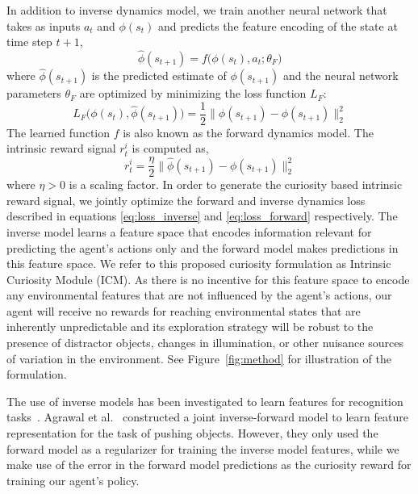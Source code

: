 \documentclass{article}
\begin{document}
In addition to inverse dynamics model, we train another neural network that takes as inputs $a_t$ and $\phi(s_t)$ and predicts the feature encoding of the state at time step $t+1$,
\begin{equation}
   \hat{\phi}(s_{t+1}) = f\Big(\phi(s_{t}), a_t; \theta_F\Big)
\end{equation}
where $\hat{\phi}(s_{t+1})$ is the predicted estimate of $\phi(s_{t+1})$ and the neural network parameters $\theta_F$ are optimized by minimizing the loss function $L_F$:
\begin{equation}
\label{eq:loss_forward}
L_F\Big(\phi(s_{t}), \hat{\phi}(s_{t+1})\Big) = \frac{1}{2} \| \hat{\phi}(s_{t+1}) - \phi(s_{t+1}) \|_2^{2}
\end{equation}
The learned function $f$ is also known as the forward dynamics model.
The intrinsic reward signal $r_t^{i}$ is computed as,
\begin{equation}
   r_t^{i} = \frac{\eta}{2} \| \hat{\phi}(s_{t+1}) - \phi(s_{t+1}) \|_2^{2}
\end{equation}
where $\eta > 0$ is a scaling factor. In order to generate the curiosity based intrinsic reward signal, we jointly optimize the forward and inverse dynamics loss described in equations \ref{eq:loss_inverse} and \ref{eq:loss_forward} respectively. The inverse model learns a feature space that encodes information relevant for predicting the agent's actions only and the forward model makes predictions in this feature space. We refer to this proposed curiosity formulation as Intrinsic Curiosity Module (ICM). As there is no incentive for this feature space to encode any environmental features that are not influenced by the agent's actions, our agent will receive no rewards for reaching environmental states that are inherently unpredictable and its exploration strategy will be robust to the presence of distractor objects, changes in illumination,  or other nuisance sources of variation in the environment. See Figure~\ref{fig:method} for illustration of the formulation.

The use of inverse models has been investigated to learn features for recognition tasks~\cite{jayaraman2015learning,agrawal2015learning}. Agrawal et al.~ constructed a joint inverse-forward model to learn feature representation for the task of pushing objects. However, they only used the forward model as a regularizer for training the inverse model features, while we make use of the error in the forward model predictions as the curiosity reward for training our agent's policy.
\end{document}
